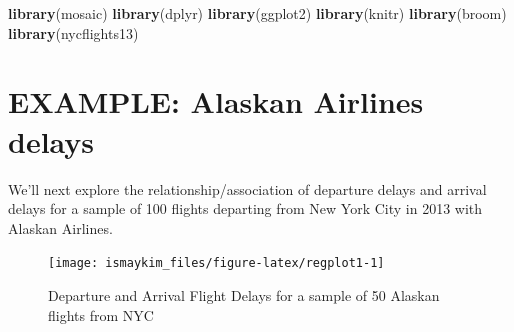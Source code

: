 \documentclass[]{tufte-book}
\newenvironment{Shaded}{\begin{snugshade}}{\end{snugshade}}
\newcommand{\KeywordTok}[1]{\textcolor[rgb]{0.13,0.29,0.53}{\textbf{{#1}}}}
\newcommand{\DataTypeTok}[1]{\textcolor[rgb]{0.13,0.29,0.53}{{#1}}}
\newcommand{\DecValTok}[1]{\textcolor[rgb]{0.00,0.00,0.81}{{#1}}}
\newcommand{\StringTok}[1]{\textcolor[rgb]{0.31,0.60,0.02}{{#1}}}
\newcommand{\CommentTok}[1]{\textcolor[rgb]{0.56,0.35,0.01}{\textit{{#1}}}}
\newcommand{\OtherTok}[1]{\textcolor[rgb]{0.56,0.35,0.01}{{#1}}}
\newcommand{\NormalTok}[1]{{#1}}
\theoremstyle{definition}
\theoremstyle{definition}
\theoremstyle{remark}
\begin{document}
\begin{Shaded}
\begin{Highlighting}[]
\KeywordTok{library}\NormalTok{(mosaic)}
\KeywordTok{library}\NormalTok{(dplyr)}
\KeywordTok{library}\NormalTok{(ggplot2)}
\KeywordTok{library}\NormalTok{(knitr)}
\KeywordTok{library}\NormalTok{(broom)}
\KeywordTok{library}\NormalTok{(nycflights13)}
\end{Highlighting}
\end{Shaded}

\section{EXAMPLE: Alaskan Airlines
delays}\label{example-alaskan-airlines-delays}

We'll next explore the relationship/association of departure delays and
arrival delays for a sample of 100 flights departing from New York City
in 2013 with Alaskan Airlines.

\begin{Shaded}
\end{Shaded}

\begin{figure}

{\centering \texttt{[image: ismaykim\_files/figure-latex/regplot1-1]} 

}

\caption[Departure and Arrival Flight Delays for a sample of 50 Alaskan flights from NYC]{Departure and Arrival Flight Delays for a sample of 50 Alaskan flights from NYC}\label{fig:regplot1}
\end{figure}
\end{document}
